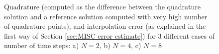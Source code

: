 \documentclass[11pt]{article}
\begin{document}
\begin{figure}[htb]
\begin{subfigure}{0.6\textwidth}
		\caption{}
		\label{fig:3}
	\end{subfigure}
	\caption{Quadrature (computed as the difference between the quadrature solution and a reference solution computed with very high number of quadrature points),   and interpolation error  (as explained in the first way of Section \ref{sec:MISC error estimate}) for $3$ different cases of number of time steps: a) $N=2$, b) $N=4$,  c) $N=8$}
	\label{fig:Quadrature and interpolation error estimation for 3 different cases of number of time steps}
\end{figure}
\FloatBarrier





 








 

 

 
 
 
\end{document}
